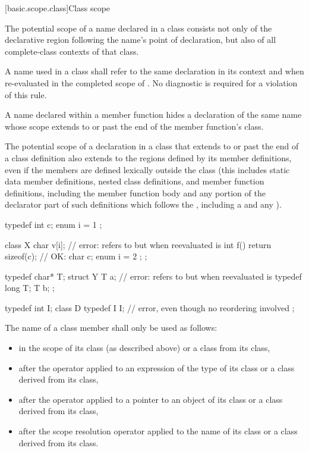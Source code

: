[basic.scope.class]{Class scope}
%

\pnum
The potential scope of a name declared in a class consists not
only of the declarative region following the name's point of
declaration, but also of all complete-class contexts
of that class.

\pnum
A name  used in a class  shall refer to the same
declaration in its context and when re-evaluated in the completed scope
of . No diagnostic is required for a violation of this rule.

\pnum
A name declared within a member function hides a declaration of
the same name whose scope extends to or past the end of the member
function's class.

\pnum
The potential scope of a declaration in a class that extends to or past the
end of a class definition also extends to the regions defined by its
member definitions, even if the members are defined lexically outside
the class (this includes static data member definitions, nested class
definitions, and member function definitions, including the member function
body and any portion of the
declarator part of such definitions which follows the ,
including a  and any ).

\pnum
\begin{example}
\begin{codeblock}
typedef int  c;
enum { i = 1 };

class X {
  char  v[i];                       // error:  refers to  but when reevaluated is 
  int  f() { return sizeof(c); }    // OK: 
  char  c;
  enum { i = 2 };
};

typedef char*  T;
struct Y {
  T  a;                             // error:  refers to  but when reevaluated is 
  typedef long  T;
  T  b;
};

typedef int I;
class D {
  typedef I I;                      // error, even though no reordering involved
};
\end{codeblock}
\end{example}

\pnum
The name of a class member shall only be used as follows:
\begin{itemize}
\item in the scope of its class (as described above) or a class
 from its class,
\item after the  operator applied to an expression of the type
of its class or a class derived from its class,
\item after the \tcode{->} operator applied to a pointer to an object of
its class or a class derived from its class,
\item after the \tcode{::} scope resolution operator
applied to the name of its class or a class derived from its class.
\end{itemize}

